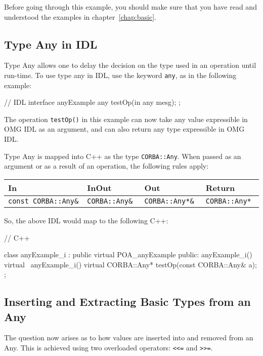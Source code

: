 \documentclass[11pt,twoside,a4paper]{book}
\newcommand{\type}[1]{\texttt{#1}}
\newcommand{\code}[1]{\texttt{#1}}
\newcommand{\op}[1]{\texttt{#1()}}
\begin{document}
Before going through this example, you should make sure that you have
read and understood the examples in chapter~\ref{chap:basic}.

\subsection{Type Any in IDL}
Type Any allows one to delay the decision on the type used in an
operation until run-time. To use type any in IDL, use the keyword
\code{any}, as in the following example:

\begin{idllisting}
// IDL
interface anyExample {
  any testOp(in any mesg);
};
\end{idllisting}


\noindent The operation \op{testOp} in this example can now take any
value expressible in OMG IDL as an argument, and can also return any
type expressible in OMG IDL.

Type Any is mapped into C++ as the type \type{CORBA::Any}. When passed
as an argument or as a result of an operation, the following rules
apply:

\mbox{}

{\small
\begin{tabular}{llll}
{\bf In }                & {\bf InOut }       & {\bf Out }           & 
{\bf Return }                                                   \\ \hline
{\tt const CORBA::Any\& }& {\tt CORBA::Any\& }& {\tt CORBA::Any*\& } & 
{\tt CORBA::Any* }
\end{tabular}
}

\mbox{}

\noindent So, the above IDL would map to the following C++:

\begin{cxxlisting}
// C++

class anyExample_i : public virtual POA_anyExample {
public:
  anyExample_i() { }
  virtual ~anyExample_i() { }
  virtual CORBA::Any* testOp(const CORBA::Any& a);
};
\end{cxxlisting}


\subsection{Inserting and Extracting Basic Types from an Any}

The question now arises as to how values are inserted into and removed
from an Any. This is achieved using two overloaded operators:
\code{<{}<=} and \code{>{}>=}.
\end{document}
